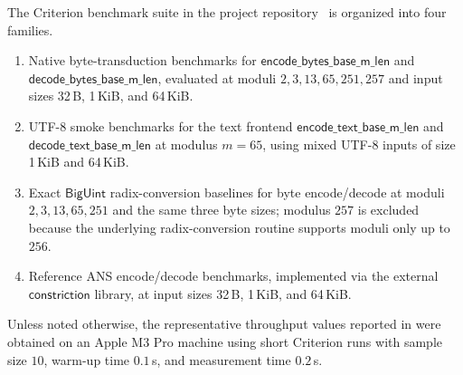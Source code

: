 \documentclass{system-security-article}
\begin{document}
    The Criterion benchmark suite in the project repository~\cite{riabov2026encodingrepo}
    is organized into four families.
    \begin{enumerate}
        \item Native byte-transduction benchmarks for
        \(\mathsf{encode\_bytes\_base\_m\_len}\) and
        \(\mathsf{decode\_bytes\_base\_m\_len}\), evaluated at moduli
        \(2,3,13,65,251,257\) and input sizes 32\,B, 1\,KiB, and 64\,KiB\@.
        \item UTF-8 smoke benchmarks for the text frontend \(\mathsf{encode\_text\_base\_m\_len}\)
        and \(\mathsf{decode\_text\_base\_m\_len}\) at modulus \(m=65\),
        using mixed UTF-8 inputs of size 1\,KiB and 64\,KiB\@.
        \item Exact \(\mathsf{BigUint}\) radix-conversion baselines for byte encode/decode at moduli \(2,3,13,65,251\)
        and the same three byte sizes; modulus \(257\) is excluded because the underlying radix-conversion
        routine supports moduli only up to \(256\).
        \item Reference ANS encode/decode benchmarks, implemented via the external \(\mathsf{constriction}\)
        library, at input sizes 32\,B, 1\,KiB, and 64\,KiB\@.
    \end{enumerate}

    Unless noted otherwise, the representative throughput values reported in  were obtained
    on an Apple M3 Pro machine using short Criterion runs with sample size \(10\), warm-up time \(0.1\)\,s,
    and measurement time \(0.2\)\,s.

    \printbibliography[title={References}]
\end{document}

